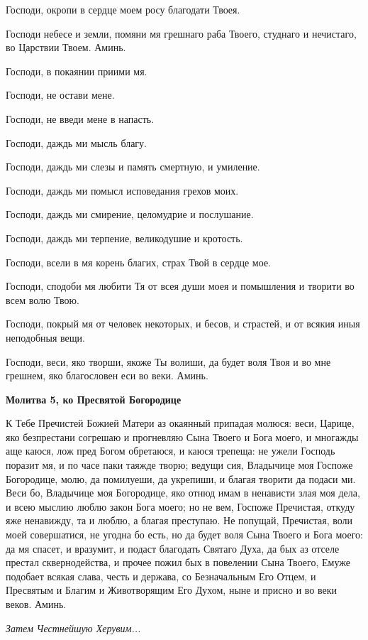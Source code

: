 Господи, окропи в сердце моем росу благодати Твоея.

Господи небесе и земли, помяни мя грешнаго раба Твоего, студнаго и нечистаго, во Царствии Твоем. Аминь.

Господи, в покаянии приими мя.

Господи, не остави мене.

Господи, не введи мене в напасть.

Господи, даждь ми мысль благу.

Господи, даждь ми слезы и память смертную, и умиление.

Господи, даждь ми помысл исповедания грехов моих.

Господи, даждь ми смирение, целомудрие и послушание.

Господи, даждь ми терпение, великодушие и кротость.

Господи, всели в мя корень благих, страх Твой в сердце мое.

Господи, сподоби мя любити Тя от всея души моея и помышления и творити во всем волю Твою.

Господи, покрый мя от человек некоторых, и бесов, и страстей, и от всякия иныя неподобныя вещи.

Господи, веси, яко творши, якоже Ты волиши, да будет воля Твоя и во мне грешнем, яко благословен еси во веки. Аминь.


\medskip


\bfseries Молитва 5, ко Пресвятой Богородице

\normalfont{}К Тебе Пречистей Божией Матери аз окаянный припадая молюся: веси, Царице, яко безпрестани согрешаю и прогневляю Сына Твоего и Бога моего, и многажды аще каюся, лож пред Богом обретаюся, и каюся трепеща: не ужели Господь поразит мя, и по часе паки таяжде творю; ведущи сия, Владычице моя Госпоже Богородице, молю, да помилуеши, да укрепиши, и благая творити да подаси ми. Веси бо, Владычице моя Богородице, яко отнюд имам в ненависти злая моя дела, и всею мыслию люблю закон Бога моего; но не вем, Госпоже Пречистая, откуду яже ненавижду, та и люблю, а благая преступаю. Не попущай, Пречистая, воли моей совершатися, не угодна бо есть, но да будет воля Сына Твоего и Бога моего: да мя спасет, и вразумит, и подаст благодать Святаго Духа, да бых аз отселе престал сквернодейства, и прочее пожил бых в повелении Сына Твоего, Емуже подобает всякая слава, честь и держава, со Безначальным Его Отцем, и Пресвятым и Благим и Животворящим Его Духом, ныне и присно и во веки веков. Аминь.


\itshape Затем \normalfont{}Честнейшую Херувим... 

